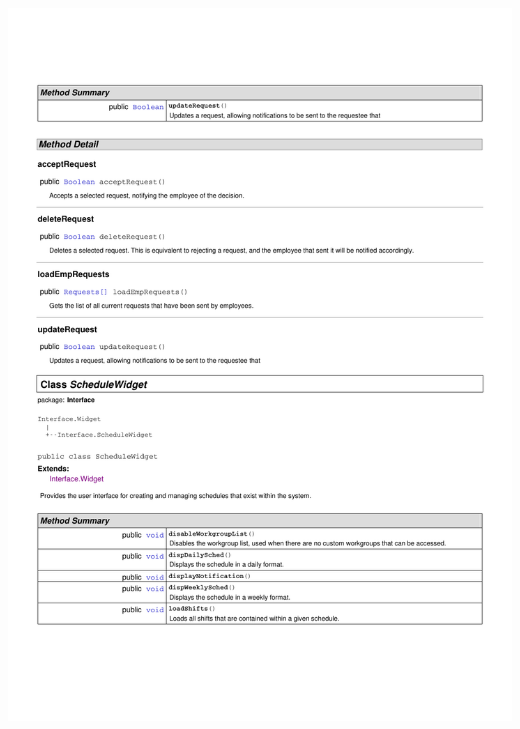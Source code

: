 \documentclass[letterpaper,12pt]{report}
\begin{document}
\includegraphics[scale=0.9,trim=20mm 30mm 25mm 25mm]{externals/InterfaceDataDictionary8.pdf}
\newpage
\end{document}
